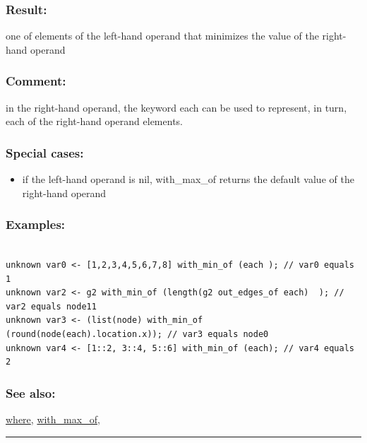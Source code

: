\documentclass[]{book}
\providecommand{\tightlist}{%
  \setlength{\itemsep}{0pt}\setlength{\parskip}{0pt}}
\theoremstyle{definition}
\theoremstyle{definition}
\theoremstyle{definition}
\theoremstyle{remark}
\begin{document}
\subsubsection{Result:}\label{result-537}

one of elements of the left-hand operand that minimizes the value of the
right-hand operand

\subsubsection{Comment:}\label{comment-110}

in the right-hand operand, the keyword each can be used to represent, in
turn, each of the right-hand operand elements.

\subsubsection{Special cases:}\label{special-cases-148}

\begin{itemize}
\tightlist
\item
  if the left-hand operand is nil, with\_max\_of returns the default
  value of the right-hand operand
\end{itemize}

\subsubsection{Examples:}\label{examples-385}

\begin{verbatim}
 
unknown var0 <- [1,2,3,4,5,6,7,8] with_min_of (each ); // var0 equals 1 
unknown var2 <- g2 with_min_of (length(g2 out_edges_of each)  ); // var2 equals node11 
unknown var3 <- (list(node) with_min_of (round(node(each).location.x)); // var3 equals node0 
unknown var4 <- [1::2, 3::4, 5::6] with_min_of (each); // var4 equals 2
\end{verbatim}

\subsubsection{See also:}\label{see-also-222}

\href{operators-s-to-z.html\#where}{where},
\href{operators-s-to-z.html\#with_max_of}{with\_max\_of},

\begin{center}\rule{0.5\linewidth}{\linethickness}\end{center}
\end{document}
